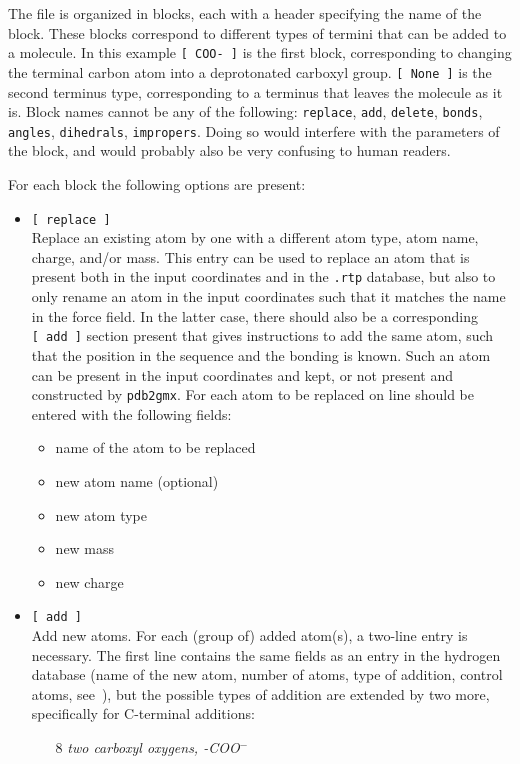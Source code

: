 The file is organized in blocks, each with a header specifying the
name of the block. These blocks correspond to different types of
termini that can be added to a molecule. In this example {\tt [~COO-~]}
is the first block, corresponding to changing the terminal carbon
atom into a deprotonated carboxyl group. {\tt [~None~]} is the
second terminus type, corresponding to a terminus that leaves
the molecule as it is. Block names cannot be any of the following:
{\tt replace}, {\tt add}, {\tt delete}, {\tt bonds}, {\tt angles},
{\tt dihedrals}, {\tt impropers}.  Doing so would interfere with
the parameters of the block, and would probably also be very confusing
to human readers.

For each block the following options are present:
\begin{itemize}
\item {\tt [~replace~]} \\
Replace an existing atom by one with a different atom type, atom name,
charge, and/or mass. This entry can be used to replace an atom that is
present both in the input coordinates and in the {\tt .rtp} database,
but also to only rename an atom in the input coordinates such that
it matches the name in the force field. In the latter case, there
should also be a corresponding {\tt [~add~]} section present that
gives instructions to add the same atom, such that the position in the sequence
and the bonding is known. Such an atom can be present in the input
coordinates and kept, or not present and constructed by {\tt pdb2gmx}.
For each atom to be replaced on line should be
entered with the following fields:
\begin{itemize}
\item name of the atom to be replaced
\item new atom name (optional)
\item new atom type
\item new mass
\item new charge
\end{itemize}
\item {\tt [~add~]} \\
Add new atoms. For each (group of) added atom(s), a two-line entry is
necessary. The first line contains the same fields as an entry in the
hydrogen database (name of the new atom, 
number of atoms, type of addition, control atoms,
see~), but the possible types of addition are extended
by two more, specifically for C-terminal additions:
\begin{enumerate}
\item[8]{\em two carboxyl oxygens, -COO{$^-$}}\\

\end{enumerate}
\end{itemize}
